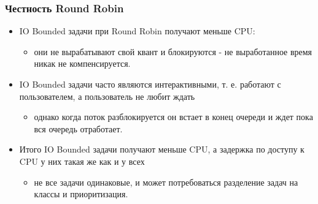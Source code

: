 \begin{frame}
\frametitle{Честность Round Robin}
\begin{itemize}
  \item IO Bounded задачи при Round Robin получают меньше CPU:
  \begin{itemize}
    \item они не вырабатывают свой квант и блокируются - не выработанное время
    никак не компенсируется.
  \end{itemize}
  \item IO Bounded задачи часто являются интерактивными, т. е. работают с
  пользователем, а пользователь не любит ждать
  \begin{itemize}
    \item однако когда поток разблокируется он встает в конец очереди и ждет
    пока вся очередь отработает.
  \end{itemize}
  \item Итого IO Bounded задачи получают меньше CPU, а задержка по доступу к CPU
  у них такая же как и у всех
  \begin{itemize}
    \item не все задачи одинаковые, и может потребоваться разделение задач на
    классы и приоритизация.
  \end{itemize}
\end{itemize}
\end{frame}
